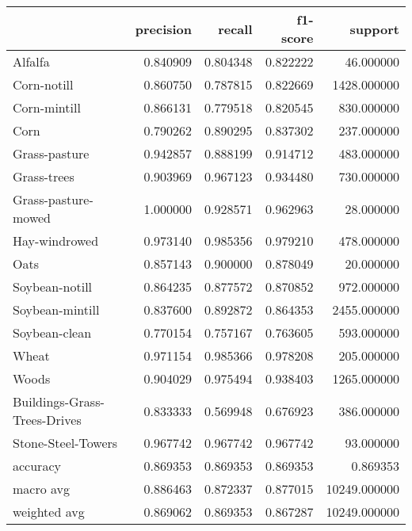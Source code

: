 \begin{tabular}{lrrrr}
\toprule
{} &  precision &    recall &  f1-score &       support \\
\midrule
Alfalfa                      &   0.840909 &  0.804348 &  0.822222 &     46.000000 \\
Corn-notill                  &   0.860750 &  0.787815 &  0.822669 &   1428.000000 \\
Corn-mintill                 &   0.866131 &  0.779518 &  0.820545 &    830.000000 \\
Corn                         &   0.790262 &  0.890295 &  0.837302 &    237.000000 \\
Grass-pasture                &   0.942857 &  0.888199 &  0.914712 &    483.000000 \\
Grass-trees                  &   0.903969 &  0.967123 &  0.934480 &    730.000000 \\
Grass-pasture-mowed          &   1.000000 &  0.928571 &  0.962963 &     28.000000 \\
Hay-windrowed                &   0.973140 &  0.985356 &  0.979210 &    478.000000 \\
Oats                         &   0.857143 &  0.900000 &  0.878049 &     20.000000 \\
Soybean-notill               &   0.864235 &  0.877572 &  0.870852 &    972.000000 \\
Soybean-mintill              &   0.837600 &  0.892872 &  0.864353 &   2455.000000 \\
Soybean-clean                &   0.770154 &  0.757167 &  0.763605 &    593.000000 \\
Wheat                        &   0.971154 &  0.985366 &  0.978208 &    205.000000 \\
Woods                        &   0.904029 &  0.975494 &  0.938403 &   1265.000000 \\
Buildings-Grass-Trees-Drives &   0.833333 &  0.569948 &  0.676923 &    386.000000 \\
Stone-Steel-Towers           &   0.967742 &  0.967742 &  0.967742 &     93.000000 \\
accuracy                     &   0.869353 &  0.869353 &  0.869353 &      0.869353 \\
macro avg                    &   0.886463 &  0.872337 &  0.877015 &  10249.000000 \\
weighted avg                 &   0.869062 &  0.869353 &  0.867287 &  10249.000000 \\
\bottomrule
\end{tabular}
